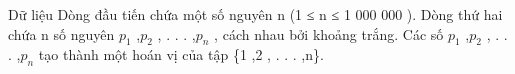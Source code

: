 Dữ liệu  
Dòng đầu tiến chứa một số nguyên n (1 ≤ n ≤ 1 000 000 ). Dòng thứ hai chứa n số nguyên $p_{1}$   ,$p_{2}$   , . . . ,$p_{n}$   , cách nhau bởi khoảng trắng. Các số $p_{1}$   ,$p_{2}$   , . . . ,$p_{n}$   tạo thành một hoán vị của tập \{1 ,2 , . . . ,n\}.